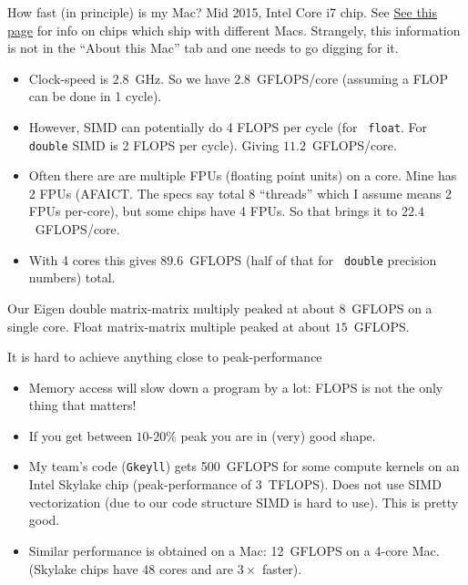 \documentclass[aspectratio=169]{beamer}
\newcommand{\mypause}{\pause}
\begin{document}
\begin{frame}{How fast (in principle) is my Mac?}
  Mid 2015, Intel Core i7 chip.  See
  \href{https://everymac.com/systems/apple/macbook_pro/specs/macbook-pro-core-i7-2.8-15-iris-only-mid-2015-retina-display-specs.html}{See
    this page} for info on chips which ship with different
  Macs. Strangely, this information is not in the ``About this Mac''
  tab and one needs to go digging for it.
  \begin{itemize}
  \item Clock-speed is $2.8$~GHz. So we have $2.8$~GFLOPS/core
    (assuming a FLOP can be done in 1 cycle).%
    \mypause%
  \item However, SIMD can potentially do 4 FLOPS per cycle (for {\tt
      float}. For {\tt double} SIMD is 2 FLOPS per cycle). Giving
    $11.2$~GFLOPS/core.%
    \mypause%
  \item Often there are are multiple FPUs (floating point units) on a
    core. Mine has 2 FPUs (AFAICT. The specs say total 8 ``threads''
    which I assume means 2 FPUs per-core), but some chips have 4
    FPUs. So that brings it to $22.4$~GFLOPS/core.
  \item With 4 cores this gives $89.6$~GFLOPS (half of that for {\tt
      double} precision numbers) total.
  \end{itemize}
  Our Eigen double matrix-matrix multiply peaked at about $8$~GFLOPS
  on a single core. Float matrix-matrix multiple peaked at about
  $15$~GFLOPS.
\end{frame}

\begin{frame}{It is hard to achieve anything close to
    peak-performance}
  \begin{itemize}
  \item Memory access will slow down a program by a lot: FLOPS is not
    the only thing that matters!
  \item If you get between $10$-$20\%$ peak you are in (very) good
    shape.
  \item My team's code ({\tt Gkeyll}) gets 500~GFLOPS for some compute
    kernels on an Intel Skylake chip (peak-performance of
    3~TFLOPS). Does not use SIMD vectorization (due to our code
    structure SIMD is hard to use). This is pretty good.
  \item Similar performance is obtained on a Mac: 12~GFLOPS on a
    4-core Mac. (Skylake chips have 48 cores and are $3\times$
    faster).
  \end{itemize}
\end{frame}
\end{document}
